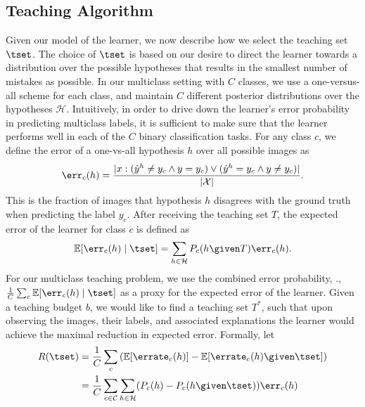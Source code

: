 \documentclass[../main.tex]{subfiles}
\begin{document}
\subsection{Teaching Algorithm}
Given our model of the learner, we now describe how we select the teaching set $\tset$. %
The choice of $\tset$ is based on our desire to direct the learner towards a distribution over the possible hypotheses that results in the smallest number of mistakes as possible. In our multiclass setting with $C$ classes, we use a one-versus-all scheme for each class, and maintain $C$ different posterior distributions over the hypotheses $\mathcal{H}$. Intuitively, in order to drive down the learner's error probability in predicting multiclass labels, it is sufficient to make sure that the learner performs well in each of the $C$ binary classification tasks. For any class $c$, we define the error of a one-vs-all hypothesis $h$ over all possible images as
\begin{align*}
  \err_c(h) = \frac{|{x: (\hat{y}^h \neq y_c \wedge y=y_c) \vee (\hat{y}^h = y_c \wedge y\neq y_c)}|}{| {\mathcal X} |}.
\end{align*}
This is the fraction of images that hypothesis $h$ disagrees with the ground truth when predicting the label $y_c$. After receiving the teaching set $T$, the expected error of the learner for class $c$ is defined as
\begin{align}
  \mathbb{E}[\err_c(h)\mid \tset] = \sum \limits_{h \in \mathcal{H}}P_c(h\given T)\err_c(h).
\end{align}
For our multiclass teaching problem, we use the combined error probability, \ie., $\frac1C\sum_c \mathbb{E}[\err_c(h)\mid \tset]$
as a proxy for the expected error of the learner. Given a teaching budget $b$, we would like to find a teaching set $T^*$, such that upon observing the images, their labels, and associated explanations the learner would achieve the maximal reduction in expected error. Formally, let
\begin{align}
  R(\tset) &= \frac1C\sum_c\left(\mathbb{E}[\errate_c(h)] - \mathbb{E}[\errate_c(h)\given \tset] \right)\nonumber \\
           &=\frac1C\sum_{c \in \mathcal{C}} \sum \limits_{h \in \mathcal{H}}(P_c(h) - P_c(h\given \tset))\err_c(h)\label{eqn:objective}
\end{align}
\end{document}
